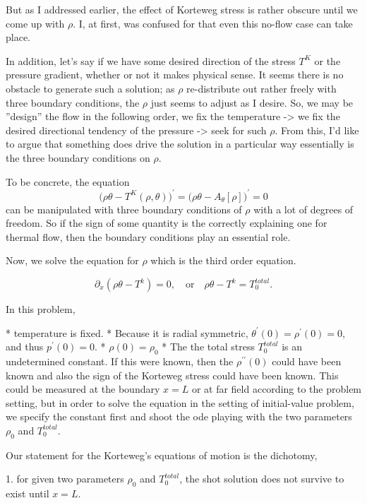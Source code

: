 \documentclass[a4paper,12pt]{article}
\begin{document}
But as I addressed earlier, the effect of Korteweg stress is rather obscure until we come up with $\rho$. I, at first, was confused for that even this no-flow case can take place.

In addition, let's say if we have some desired direction of the stress {{{$T^K$}}} or the pressure gradient, whether or not it makes physical sense. It seems there is no obstacle to generate such a solution; as $\rho$ re-distribute out rather freely with three boundary conditions, the $\rho$ just seems to adjust as I desire. So, we may be ''design'' the flow in the following order, we fix the temperature -> we fix the desired directional tendency of the pressure -> seek for such $\rho$. From this, I'd like to argue that something does drive the solution in a particular way essentially is the three boundary conditions on $\rho$.

To be concrete, the equation {{{$$ \big(\rho\theta - T^K(\rho,\theta)\big)^\prime = \big( \rho\theta - A_\theta[\rho] \big)^\prime = 0 $$}}} can be manipulated with three boundary conditions of $\rho$ with a lot of degrees of freedom. So if the sign of some quantity is the correctly explaining one for thermal flow, then the boundary conditions play an essential role.

Now, we solve the equation for $\rho$ which is the third order equation.

{{{$$ \partial_x(\rho\theta - T^k) = 0, \quad \text{or} \quad \rho\theta - T^k = T^{total}_0.$$}}}

In this problem,

 * temperature is fixed.
 * Because it is radial symmetric, {{{$\theta^\prime(0) = \rho^\prime(0)=0$, and thus $p^\prime(0)=0$.}}}
 * {{{$\rho(0)= \rho_0$}}}
 * The the total stress {{{$T^{total}_0$}}} is an undetermined constant. If this were known, then the {{{$\rho^{\prime\prime}(0)$}}} could have been known and also the sign of the Korteweg stress could have been known. This could be measured at the boundary $x=L$ or at far field according to the problem setting, but in order to solve the equation in the setting of initial-value problem, we specify the constant first and shoot the ode playing with the two parameters {{{$\rho_0$}}} and {{{$T^{total}_0$}}}.

Our statement for the Korteweg's equations of motion is the dichotomy,

 1. for given two parameters {{{$\rho_0$}}} and {{{$T^{total}_0$}}}, the shot solution does not survive to exist until $x=L$.
\end{document}
